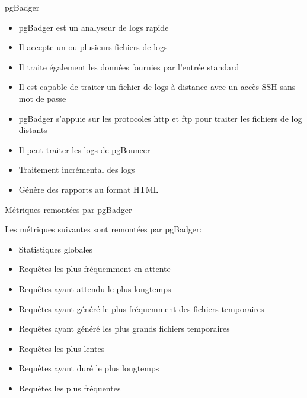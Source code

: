 
\begin{frame}{pgBadger}

   \begin{itemize}
      \item pgBadger est un analyseur de logs rapide
      \item Il accepte un ou plusieurs fichiers de logs
      \item Il traite également les données fournies par l'entrée standard
      \item Il est capable de traiter un fichier de logs à distance avec un accès SSH sans mot de passe
      \item pgBadger s'appuie sur les protocoles http et ftp pour traiter les fichiers de log distants
      \item Il peut traiter les logs de pgBouncer
      \item Traitement incrémental des logs
      \item Génère des rapports au format HTML

   \end{itemize}

\begin{tiny}
\begin{toile}
\end{toile}
\end{tiny}

\end{frame}


\begin{frame}{Métriques remontées par pgBadger}

   Les métriques suivantes sont remontées par pgBadger:
   \begin{itemize}
      \item Statistiques globales
      \item Requêtes les plus fréquemment en attente
      \item Requêtes ayant attendu le plus longtemps
      \item Requêtes ayant généré le plus fréquemment des fichiers temporaires
      \item Requêtes ayant généré les plus grands fichiers temporaires
      \item Requêtes les plus lentes
      \item Requêtes ayant duré le plus longtemps
      \item Requêtes les plus fréquentes
   \end{itemize}

\end{frame}

